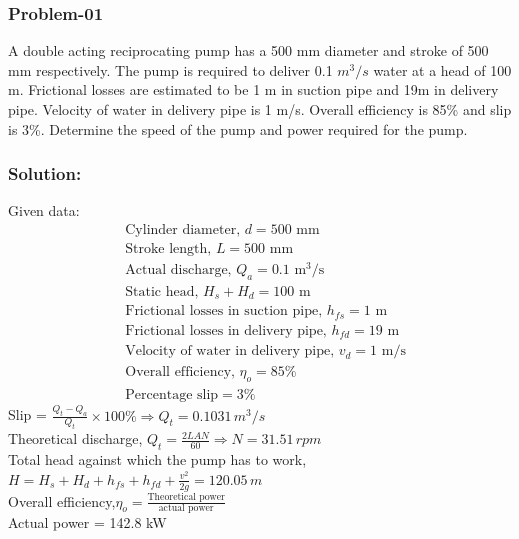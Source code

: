 \documentclass{article}
\begin{document}
    \begin{multicols}{2}
      \subsubsection*{Problem-01}
      A double acting reciprocating pump has a 500 mm diameter and stroke of 500 mm respectively. The pump is required to deliver 0.1 $m^3/s$ water at a head of 100 m. Frictional losses are estimated to be 1 m in suction pipe and 19m in delivery pipe. Velocity of water in delivery pipe is 1 m/s. Overall efficiency is 85\% and slip is 3\%. Determine the speed of the pump and power required for the pump. 

      \subsubsection*{Solution:} 
      Given data:\\
      \begin{align*}
        &\text{Cylinder diameter, } d = 500 \text{ mm} \\
        &\text{Stroke length, } L = 500 \text{ mm} \\
        &\text{Actual discharge, } Q_a = 0.1 \text{ m}^3/\text{s} \\
        &\text{Static head, } H_s + H_d = 100 \text{ m} \\
        &\text{Frictional losses in suction pipe, } h_{fs} = 1 \text{ m} \\
        &\text{Frictional losses in delivery pipe, } h_{fd} = 19 \text{ m} \\
        &\text{Velocity of water in delivery pipe, } v_d = 1 \text{ m/s} \\ 
        &\text{Overall efficiency, } \eta_o = 85\% \\
        &\text{Percentage slip} = 3\%  
      \end{align*}
      Slip = $\frac{Q_t - Q_a}{Q_t} \times 100\% \Rightarrow Q_t = 0.1031 \, m^3/s $   \\
      Theoretical discharge, $Q_t = \frac{2LAN}{60} \Rightarrow  N = 31.51 \, rpm $  \\
      Total head against which the pump has to work, \\
      $H = H_s + H_d + h_{fs} + h_{fd} + \frac{v^2}{2g} = 120.05 \,m$ \\
      Overall efficiency,$\eta_o = \frac{\text{Theoretical power}}{\text{actual power}}$ \\
      Actual power = 142.8 kW  


\end{multicols}
\end{document}
